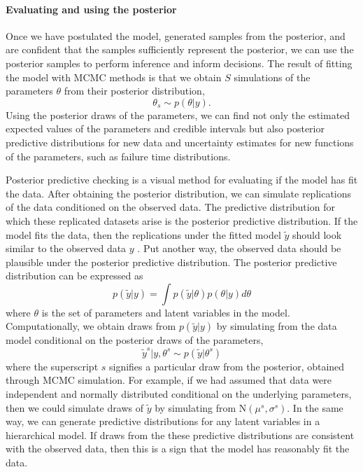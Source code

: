 \paragraph*{Evaluating and using the posterior}

Once we have postulated the model, generated samples from the posterior, and are confident that the samples sufficiently represent the posterior, we can use the posterior samples to perform inference and inform decisions. The result of fitting the model with MCMC methods is that we obtain $S$ simulations of the parameters $\theta$ from their posterior distribution,
\begin{equation}
  \theta_s \sim p(\theta|y).
\end{equation}
Using the posterior draws of the parameters, we can find not only the estimated expected values of the parameters and credible intervals but also posterior predictive distributions for new data and uncertainty estimates for new functions of the parameters, such as failure time distributions.

Posterior predictive checking \citep{BDA2020} is a visual method for evaluating if the model has fit the data. After obtaining the posterior distribution, we can simulate replications of the data conditioned on the observed data. The predictive distribution for which these replicated datasets arise is the posterior predictive distribution. If the model fits the data, then the replications under the fitted model $\tilde{y}$ should look similar to the observed data $y$ \citep[pp.~143]{BDA2020}. Put another way, the observed data should be plausible under the posterior predictive distribution. The posterior predictive distribution can be expressed as
\begin{equation}
 p(\tilde{y}|y) = \int p(\tilde{y}|\theta)p(\theta|y)d\theta
\end{equation}
where $\theta$ is the set of parameters and latent variables in the model. Computationally, we obtain draws from $p(\tilde{y}|y)$ by simulating from the data model conditional on the posterior draws of the parameters,
\begin{equation}
 \tilde{y}^s|y, \theta^s \sim p(\tilde{y}|\theta^s)
\end{equation}
where the superscript $s$ signifies a particular draw from the posterior, obtained through MCMC simulation. For example, if we had assumed that data were independent and normally distributed conditional on the underlying parameters, then we could simulate draws of $\tilde{y}$ by simulating from $\mbox{N}(\mu^s, \sigma^s)$. In the same way, we can generate predictive distributions for any latent variables in a hierarchical model. If draws from the these predictive distributions are consistent with the observed data, then this is a sign that the model has reasonably fit the data.

